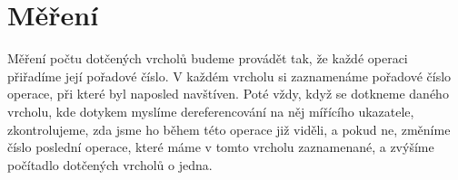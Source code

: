 \section{Měření}

Měření počtu dotčených vrcholů budeme provádět tak, že každé operaci  přiřadíme její pořadové číslo. V každém vrcholu si zaznamenáme pořadové číslo operace, při které byl naposled navštíven. Poté vždy, když se dotkneme daného vrcholu, kde dotykem myslíme dereferencování na něj mířícího ukazatele, zkontrolujeme, zda jsme ho během této operace již viděli, a pokud ne, změníme číslo poslední operace, které máme v tomto vrcholu zaznamenané, a zvýšíme počítadlo dotčených vrcholů o jedna. 
